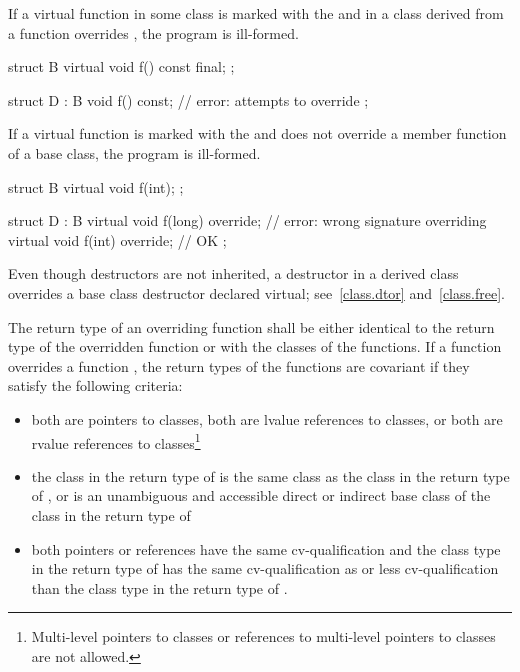 \pnum
If a virtual function  in some class  is marked with the
  and in a class  derived from 
a function  overrides , the program is ill-formed. \enterexample
\begin{codeblock}
struct B {
  virtual void f() const final;
};

struct D : B {
  void f() const;     // error:  attempts to override  
};
\end{codeblock}
\exitexample

\pnum
If a virtual function is marked with the   and
does not override a member function of a base class, the program is ill-formed. \enterexample
\begin{codeblock}
struct B {
  virtual void f(int);
};

struct D : B {
  virtual void f(long) override;  // error: wrong signature overriding 
  virtual void f(int) override;   // OK
};
\end{codeblock}
\exitexample

\pnum
Even though destructors are not inherited, a destructor in a derived
class overrides a base class destructor declared virtual;
see~\ref{class.dtor} and~\ref{class.free}.

\pnum
The return type of an overriding function shall be either identical to
the return type of the overridden function or  with
the classes of the functions. If a function  overrides a
function , the return types of the functions are covariant
if they satisfy the following criteria:
\begin{itemize}
\item both are pointers to classes, both are lvalue references to
classes, or both are rvalue references to classes\footnote{Multi-level pointers to classes or references to multi-level pointers to
classes are not allowed.%
}

\item the class in the return type of  is the same class as
the class in the return type of , or is an unambiguous and
accessible direct or indirect base class of the class in the return type
of 

\item both pointers or references have the same cv-qualification and the
class type in the return type of  has the same
cv-qualification as or less cv-qualification than the class type in the
return type of .
\end{itemize}

